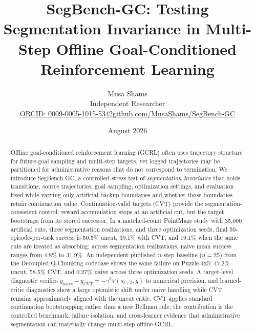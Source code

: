 \documentclass[11pt]{article}
\title{SegBench-GC: Testing Segmentation Invariance in Multi-Step Offline Goal-Conditioned Reinforcement Learning}
\author{Musa Shams\\Independent Researcher\\\href{https://orcid.org/0009-0005-1015-5342}{ORCID: 0009-0005-1015-5342}\quad\href{https://github.com/MusaShams/SegBench-GC}{github.com/MusaShams/SegBench-GC}}
\date{August 2026}
\begin{document}
\maketitle

\begin{abstract}
Offline goal-conditioned reinforcement learning (GCRL) often uses trajectory structure for future-goal sampling and multi-step targets, yet logged trajectories may be partitioned for administrative reasons that do not correspond to termination. We introduce SegBench-GC, a controlled stress test of \emph{segmentation invariance} that holds transitions, source trajectories, goal sampling, optimization settings, and evaluation fixed while varying only artificial backup boundaries and whether those boundaries retain continuation value. Continuation-valid targets (CVT) provide the segmentation-consistent control: reward accumulation stops at an artificial cut, but the target bootstraps from its stored successor. In a matched-count PointMaze study with 35,000 artificial cuts, three segmentation realizations, and three optimization seeds, final 50-episode-per-task success is 50.5\% uncut, 39.1\% with CVT, and 19.1\% when the same cuts are treated as absorbing; across segmentation realizations, naive mean success ranges from 4.8\% to 31.9\%. An independent published $n$-step baseline ($n=25$) from the Decoupled Q-Chunking codebase shows the same failure on Puzzle-4x5: 47.2\% uncut, 58.5\% CVT, and 0.27\% naive across three optimization seeds. A target-level diagnostic verifies $y_{\mathrm{naive}}-y_{\mathrm{CVT}}=-\gamma^k V(s_{t+k},g)$ to numerical precision, and learned-critic diagnostics show a large optimistic shift under naive handling while CVT remains approximately aligned with the uncut critic. CVT applies standard continuation bootstrapping rather than a new Bellman rule; the contribution is the controlled benchmark, failure isolation, and cross-learner evidence that administrative segmentation can materially change multi-step offline GCRL.
\end{abstract}













\appendix

\end{document}
